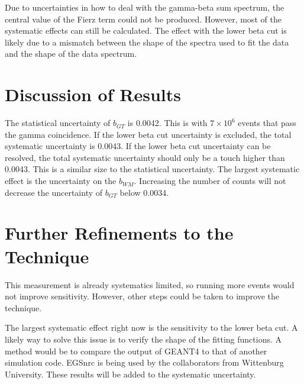 \documentclass[../MaxHughesThesis.tex]{subfiles}
\begin{document}
Due to uncertainties in how to deal with the gamma-beta sum spectrum, the central value of the Fierz term could not be produced. 
However, most of the systematic effects can still be calculated.
The effect with the lower beta cut is likely due to a mismatch between the shape of the spectra used to fit the data and the shape of the data spectrum.

\section{Discussion of Results}

The statistical uncertainty of $b_{GT}$ is 0.0042.
This is with $7 \times 10^{6}$ events that pass the gamma coincidence.
If the lower beta cut uncertainty is excluded, the total systematic uncertainty is 0.0043.
If the lower beta cut uncertainty can be resolved, the total systematic uncertainty should only be a touch higher than 0.0043.
This is a similar size to the statistical uncertainty.
The largest systematic effect is the uncertainty on the $b_{WM}$.
Increasing the number of counts will not decrease the uncertainty of $b_{GT}$ below 0.0034.


\section{Further Refinements to the Technique}
This measurement is already systematics limited, so running more events would not improve sensitivity.
However, other steps could be taken to improve the technique.

The largest systematic effect right now is the sensitivity to the lower beta cut. 
A likely way to solve this issue is to verify the shape of the fitting functions. 
A method would be to compare the output of GEANT4 to that of another simulation code.
EGSnrc is being used by the collaborators from Wittenburg University. 
These results will be added to the systematic uncertainty.
\end{document}
